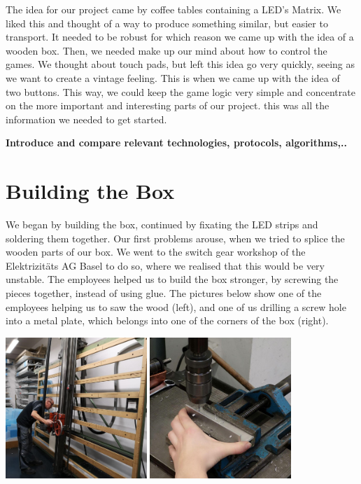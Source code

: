 \documentclass[a4paper,12pt]{article}
\begin{document}
 The idea for our project came by coffee tables containing a LED's Matrix.
 We liked this and thought of a way to produce something similar, but easier to transport.
 It needed to be robust for which reason we came up with the idea of a wooden box.
 Then, we needed make up our mind about how to control the games.
 We thought about touch pads, but left this idea go very quickly, seeing as we want to create a vintage feeling.
 This is when we came up with the idea of two buttons.
 This way, we could keep the game logic very simple and concentrate on the more important and interesting parts of our project.
 this was all the information we needed to get started.
 
 \textbf{Introduce and compare relevant technologies, protocols,
algorithms,..}

\section{Building the Box}
We began by building the box, continued by fixating the LED strips and soldering them together.
 Our first problems arouse, when we tried to splice the wooden parts of our box.
 We went to the switch gear workshop of the Elektrizitäts AG Basel to do so, where we realised that this would be very unstable.
 The employees helped us to build the box stronger, by screwing the pieces together, instead of using glue.
 The pictures below show one of the employees helping us to saw the wood (left), and one of us drilling a screw hole into a metal plate, which belongs into one of the corners of the box (right).
 
\vspace{1cm}

{ \centering
  \includegraphics[width = 0.4\textwidth]{brice.jpg}
  \space{   }
  \includegraphics[width = 0.4\textwidth]{bohren.jpg}
  \\}
 \vspace{1cm}
 
\end{document}
